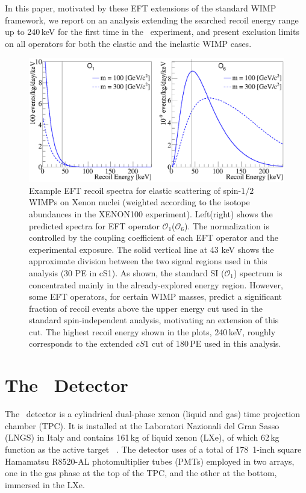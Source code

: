 In this paper, motivated by these EFT extensions of the standard WIMP framework, we report on an analysis extending the searched recoil energy range up to 240\,keV for the first time in the \Xehund\ experiment, and present exclusion limits on all operators for both the elastic and the inelastic WIMP cases.     


\begin{figure}[t!]
\centerline{\includegraphics[width=1.\linewidth]{Figures/drdeO1O6.eps}}
\caption{Example EFT recoil spectra for elastic scattering of spin-$1/2$ WIMPs on Xenon nuclei (weighted according to the isotope abundances in the XENON100 experiment). Left(right) shows the predicted spectra for EFT operator $\mathcal{O}_1$($\mathcal{O}_6$). The normalization is controlled by the coupling coefficient of each EFT operator and the experimental exposure. The solid vertical line at 43 keV shows the approximate division between the two signal regions used in this analysis (30 PE in cS1). As shown, the standard SI ($\mathcal{O}_1$) spectrum is concentrated mainly in the already-explored energy region. However, some EFT operators, for certain WIMP masses, predict a significant fraction of recoil events above the upper energy cut used in the standard spin-independent analysis, motivating an extension of this cut. The highest recoil energy shown in the plots, 240\,keV, roughly corresponds to the extended $cS1$ cut of 180\,PE used in this analysis.}
\label{fig:dRdE}
\end{figure}

\section{The \Xehund\  Detector}
The \Xehund\ detector is a cylindrical %
dual-phase xenon (liquid and gas) time projection chamber (TPC). It is installed at the Laboratori Nazionali del Gran Sasso (LNGS) in Italy
and contains 161\,kg of liquid xenon (LXe), of which 62\,kg function as the active target ~\cite{xe100_instr2012}. 
The detector uses of a total of 178~1-inch square Hamamatsu R8520-AL photomultiplier tubes (PMTs) employed in two arrays, one in the gas phase at the top of the TPC, and the other at the bottom, immersed in the LXe. 

